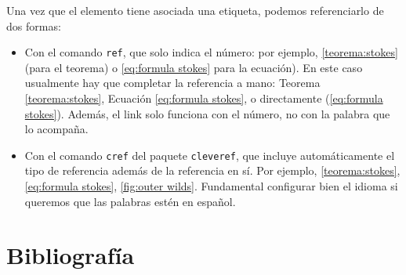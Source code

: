 \documentclass[12pt, spanish]{report}
\theoremstyle{definition} %
\theoremstyle{remark} %
\theoremstyle{plain} %
\theoremstyle{plain} %
\theoremstyle{plain} %
\theoremstyle{plain} %
\theoremstyle{plain} %
\theoremstyle{remark} %
\numberwithin{defn}{chapter}
\begin{document}
Una vez que el elemento tiene asociada una etiqueta, podemos referenciarlo de dos formas:
\begin{itemize}
    \item Con el comando \verb|ref|, que solo indica el número: por ejemplo, \ref{teorema:stokes} (para el teorema) o \ref{eq:formula stokes} para la ecuación). En este caso usualmente hay que completar la referencia a mano: Teorema \ref{teorema:stokes}, Ecuación \ref{eq:formula stokes}, o directamente (\ref{eq:formula stokes}). Además, el link solo funciona con el número, no con la palabra que lo acompaña.
    \item Con el comando \verb|cref| del paquete \verb|cleveref|, que incluye automáticamente el tipo de referencia además de la referencia en sí. Por ejemplo, \cref{teorema:stokes}, \cref{eq:formula stokes}, \cref{fig:outer wilds}. Fundamental configurar bien el idioma si queremos que las palabras estén en español.
\end{itemize}

\section{Bibliografía}
\end{document}
